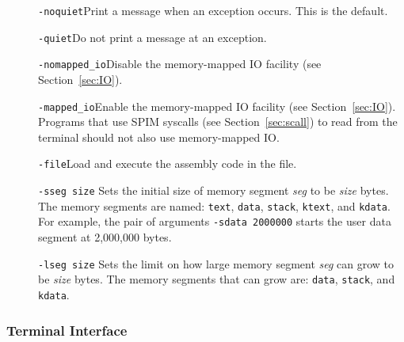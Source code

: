 \documentclass[11pt]{article}
\begin{document}
\begin{description}
  \item [] {\tt -noquiet}\newline Print a message when an exception
occurs.  This is the default.

  \item [] {\tt -quiet}\newline Do not print a message at an
exception.

  \item [] {\tt -nomapped\_io}\newline Disable the memory-mapped IO
facility (see Section~\ref{sec:IO}).

  \item [] {\tt -mapped\_io}\newline Enable the memory-mapped IO facility
(see Section~\ref{sec:IO}).  Programs that use SPIM syscalls (see
Section~\ref{sec:scall}) to read from the terminal should not also use
memory-mapped IO.

  \item [] {\tt -file}\newline Load and execute the assembly code in
the file.

  \item [] {\tt -s{seg} size} Sets the initial size of memory segment
{\em seg\/} to be {\em size\/} bytes.  The memory segments are named:
{\tt text}, {\tt data}, {\tt stack}, {\tt ktext}, and {\tt kdata}.
For example, the pair of arguments {\tt -sdata 2000000} starts the
user data segment at 2,000,000 bytes.

  \item [] {\tt -l{seg} size} Sets the limit on how large memory segment
{\em seg\/} can grow to be {\em size\/} bytes.  The memory segments
that can grow are: {\tt data}, {\tt stack}, and {\tt kdata}.
\end{description}

\subsubsection{Terminal Interface}
\end{document}
